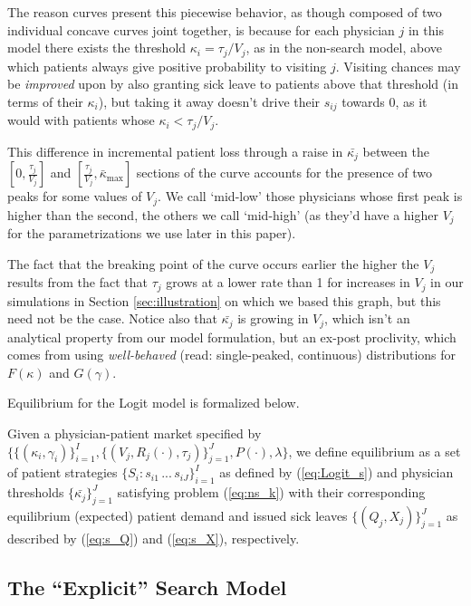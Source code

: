 \documentclass[../main.tex]{subfiles}
\begin{document}
The reason curves present this piecewise behavior, as though composed of two individual concave curves joint together, is because for each physician $j$ in this model there exists the threshold $\kappa_i = \tau_j/V_j$, as in the non-search model, above which patients always give positive probability to visiting $j$. Visiting chances may be \textit{improved} upon by also granting sick leave to patients above that threshold (in terms of their $\kappa_i$), but taking it away doesn't drive their $s_{ij}$ towards 0, as it would with patients whose $\kappa_i < \tau_j/V_j$.

This difference in incremental patient loss through a raise in $\bar{\kappa_j}$ between the $[0,\frac{\tau_j}{V_j}]$ and $[\frac{\tau_j}{V_j},\bar{\kappa}_{\max}]$ sections of the curve accounts for the presence of two peaks for some values of $V_j$. We call `mid-low' those physicians whose first peak is higher than the second, the others we call `mid-high' (as they'd have a higher $V_j$ for the parametrizations we use later in this paper).

The fact that the breaking point of the curve occurs earlier the higher the $V_j$ results from the fact that $\tau_j$ grows at a lower rate than 1 for increases in $V_j$ in our simulations in Section \ref{sec:illustration} on which we based this graph, but this need not be the case. Notice also that $\bar{\kappa_j}$ is growing in $V_j$, which isn't an analytical property from our model formulation, but an ex-post proclivity, which comes from using \textit{well-behaved} (read: single-peaked, continuous) distributions for $F(\kappa)$ and $G(\gamma)$.

Equilibrium for the Logit model is formalized below.


\begin{equilibrium}
    \label{Logit_eq}
Given a physician-patient market specified by $\{\{(\kappa_i,\gamma_i)\}_{i =1}^{I},\{(V_j, R_j(\cdot), \tau_j)\}_{j =1}^{J}, P(\cdot), \lambda \}$, we define equilibrium as a set of patient strategies $\{S_i: s_{i1} \, ... \, s_{iJ}\}_{i =1}^{I}$ as defined by (\ref{eq:Logit_s}) and physician thresholds $\{\bar{\kappa_j}\}_{j =1}^{J}$ satisfying problem (\ref{eq:ns_k}) with their corresponding equilibrium (expected) patient demand and issued sick leaves $\{(Q_j,X_j)\}_{j =1}^{J}$ as described by (\ref{eq:s_Q}) and (\ref{eq:s_X}), respectively.
\end{equilibrium}

\subsection{The ``Explicit'' Search Model}
\end{document}
